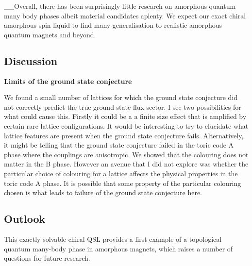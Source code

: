 \_\_Overall, there has been surprisingly little research on amorphous quantum many body phases albeit material candidates aplenty. We expect our exact chiral amorphous spin liquid to find many generalisation to realistic amorphous quantum magnets and beyond.

\hypertarget{amk-discussion}{%
\subsection{Discussion}\label{amk-discussion}}

\textbf{Limits of the ground state conjecture}

We found a small number of lattices for which the ground state conjecture did not correctly predict the true ground state flux sector. I see two possibilities for what could cause this. Firstly it could be a a finite size effect that is amplified by certain rare lattice configurations. It would be interesting to try to elucidate what lattice features are present when the ground state conjecture fails. Alternatively, it might be telling that the ground state conjecture failed in the toric code A phase where the couplings are anisotropic. We showed that the colouring does not matter in the B phase. However an avenue that I did not explore was whether the particular choice of colouring for a lattice affects the physical properties in the toric code A phase. It is possible that some property of the particular colouring chosen is what leads to failure of the ground state conjecture here.

\hypertarget{amk-outlook}{%
\subsection{Outlook}\label{amk-outlook}}

This exactly solvable chiral QSL provides a first example of a topological quantum many-body phase in amorphous magnets, which raises a number of questions for future research.

